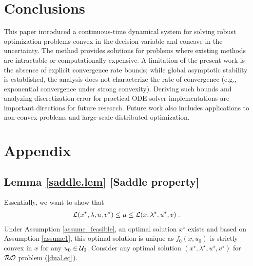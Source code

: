 \documentclass[journal,twoside,web]{ieeecolor}
\newcommand{\rev}[1]{\textcolor{revisionblue}{#1}}
\begin{document}
\section{Conclusions}\label{section_conclusions}
This paper introduced a continuous-time dynamical system for solving robust optimization problems convex in the decision variable and concave in the uncertainty. The method provides solutions for problems where existing methods are intractable or computationally expensive. \rev{A limitation of the present work is the absence of explicit convergence rate bounds; while global asymptotic stability is established, the analysis does not characterize the rate of convergence (e.g., exponential convergence under strong convexity). Deriving such bounds and analyzing discretization error for practical ODE solver implementations are important directions for future research.} Future work also includes applications to non-convex problems and large-scale distributed optimization.
\section{Appendix} \label{section_appendix}

\subsection{Lemma \ref{saddle.lem} [Saddle property]}
Essentially, we want to show that
\begin{align*}
{\cal L}(x^\star,\lambda,u,v^\star)\leq \mu \leq {\cal L}(x,\lambda^\star,u^\star,v)\;.
\end{align*}
Under Assumption \ref{assume_feasible}, an optimal solution $x^\star$ exists and based on Assumption \ref{assume1}, this optimal solution is unique as $f_0(x,u_0)$ is strictly convex in $x$ for any $u_0 \in{\cal U}_0$. Consider any optimal solution $(x^\star,\lambda^\star,u^\star,v^\star)$ for ${\cal RO}$ problem (\ref{dual.eq}).
\end{document}
